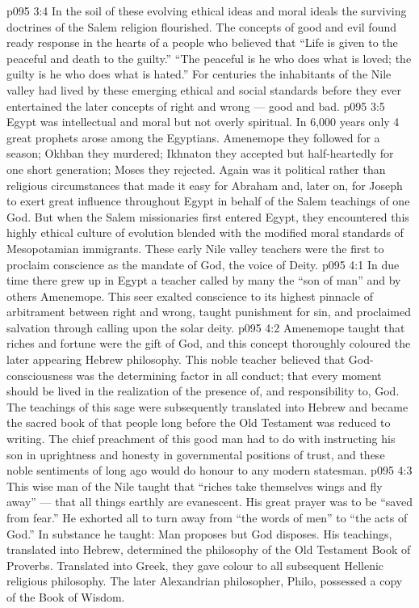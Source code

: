 \vs p095 3:4 In the soil of these evolving ethical ideas and moral ideals the surviving doctrines of the Salem religion flourished. The concepts of good and evil found ready response in the hearts of a people who believed that “Life is given to the peaceful and death to the guilty.” “The peaceful is he who does what is loved; the guilty is he who does what is hated.” For centuries the inhabitants of the Nile valley had lived by these emerging ethical and social standards before they ever entertained the later concepts of right and wrong --- good and bad.
\vs p095 3:5 \pc Egypt was intellectual and moral but not overly spiritual. In 6,000 years only 4 great prophets arose among the Egyptians. Amenemope they followed for a season; Okhban they murdered; Ikhnaton they accepted but half\hyp{}heartedly for one short generation; Moses they rejected. Again was it political rather than religious circumstances that made it easy for Abraham and, later on, for Joseph to exert great influence throughout Egypt in behalf of the Salem teachings of one God. But when the Salem missionaries first entered Egypt, they encountered this highly ethical culture of evolution blended with the modified moral standards of Mesopotamian immigrants. These early Nile valley teachers were the first to proclaim conscience as the mandate of God, the voice of Deity.
\vs p095 4:1 In due time there grew up in Egypt a teacher called by many the “son of man” and by others Amenemope. This seer exalted conscience to its highest pinnacle of arbitrament between right and wrong, taught punishment for sin, and proclaimed salvation through calling upon the solar deity.
\vs p095 4:2 Amenemope taught that riches and fortune were the gift of God, and this concept thoroughly coloured the later appearing Hebrew philosophy. This noble teacher believed that God\hyp{}consciousness was the determining factor in all conduct; that every moment should be lived in the realization of the presence of, and responsibility to, God. The teachings of this sage were subsequently translated into Hebrew and became the sacred book of that people long before the Old Testament was reduced to writing. The chief preachment of this good man had to do with instructing his son in uprightness and honesty in governmental positions of trust, and these noble sentiments of long ago would do honour to any modern statesman.
\vs p095 4:3 This wise man of the Nile taught that “riches take themselves wings and fly away” --- that all things earthly are evanescent. His great prayer was to be “saved from fear.” He exhorted all to turn away from “the words of men” to “the acts of God.” In substance he taught: Man proposes but God disposes. His teachings, translated into Hebrew, determined the philosophy of the Old Testament Book of Proverbs. Translated into Greek, they gave colour to all subsequent Hellenic religious philosophy. The later Alexandrian philosopher, Philo, possessed a copy of the Book of Wisdom.
